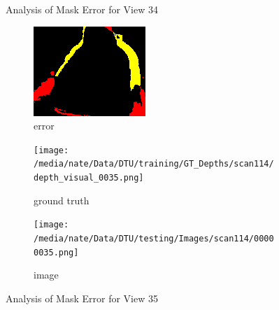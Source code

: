 \documentclass{article}
\begin{document}
\begin{figure}
\begin{subfigure}{0.3\textwidth}
		\label{fig:img34}
	\end{subfigure}
	\hfill
	\caption{Analysis of Mask Error for View 34}
	\label{fig:error_analys34}
\end{figure}\begin{figure}
	\centering
	\begin{subfigure}{0.3\textwidth}
		\centering
		\includegraphics[width=\textwidth]{./output/035_error.png}
		\caption{error}
		\label{fig:error35}
	\end{subfigure}
	\hfill
	\centering
	\begin{subfigure}{0.3\textwidth}
		\centering
		\texttt{[image: /media/nate/Data/DTU/training/GT\_Depths/scan114/depth\_visual\_0035.png]}
		\caption{ground truth}
		\label{fig:gt35}
	\end{subfigure}
	\hfill
	\centering
	\begin{subfigure}{0.3\textwidth}
		\centering
		\texttt{[image: /media/nate/Data/DTU/testing/Images/scan114/00000035.png]}
		\caption{image}
		\label{fig:img35}
	\end{subfigure}
	\hfill
	\caption{Analysis of Mask Error for View 35}
	\label{fig:error_analys35}
\end{figure}\begin{figure}
	\centering
	\begin{subfigure}{0.3\textwidth}
		\centering

\end{subfigure}
\end{figure}
\end{document}
